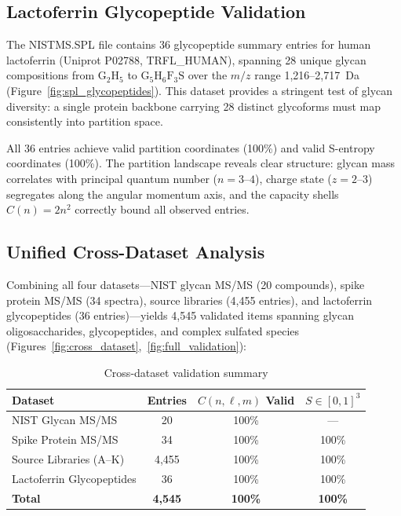 \documentclass[twocolumn,10pt,a4paper]{article}
\theoremstyle{definition}
\theoremstyle{remark}
\begin{document}
\subsection{Lactoferrin Glycopeptide Validation}
\label{sec:lactoferrin}

The NISTMS.SPL file contains 36 glycopeptide summary entries for human lactoferrin (Uniprot P02788, TRFL\_HUMAN), spanning 28 unique glycan compositions from $\text{G}_2\text{H}_5$ to $\text{G}_5\text{H}_6\text{F}_3\text{S}$ over the $m/z$ range 1,216--2,717~Da (Figure~\ref{fig:spl_glycopeptides}). This dataset provides a stringent test of glycan diversity: a single protein backbone carrying 28 distinct glycoforms must map consistently into partition space.

All 36 entries achieve valid partition coordinates (100\%) and valid S-entropy coordinates (100\%). The partition landscape reveals clear structure: glycan mass correlates with principal quantum number ($n = 3$--$4$), charge state ($z = 2$--$3$) segregates along the angular momentum axis, and the capacity shells $C(n) = 2n^2$ correctly bound all observed entries.

\subsection{Unified Cross-Dataset Analysis}
\label{sec:crossdataset}

Combining all four datasets---NIST glycan MS/MS (20 compounds), spike protein MS/MS (34 spectra), source libraries (4,455 entries), and lactoferrin glycopeptides (36 entries)---yields 4,545 validated items spanning glycan oligosaccharides, glycopeptides, and complex sulfated species (Figures~\ref{fig:cross_dataset},~\ref{fig:full_validation}):

\begin{table}[H]
\centering
\caption{Cross-dataset validation summary}
\label{tab:crossdataset}
\small
\begin{tabular}{lccc}
\toprule
\textbf{Dataset} & \textbf{Entries} & \textbf{$C(n,\ell,m)$ Valid} & \textbf{$S \in [0,1]^3$} \\
\midrule
NIST Glycan MS/MS & 20 & 100\% & --- \\
Spike Protein MS/MS & 34 & 100\% & 100\% \\
Source Libraries (A--K) & 4,455 & 100\% & 100\% \\
Lactoferrin Glycopeptides & 36 & 100\% & 100\% \\
\midrule
\textbf{Total} & \textbf{4,545} & \textbf{100\%} & \textbf{100\%} \\
\bottomrule
\end{tabular}
\end{table}
\end{document}
